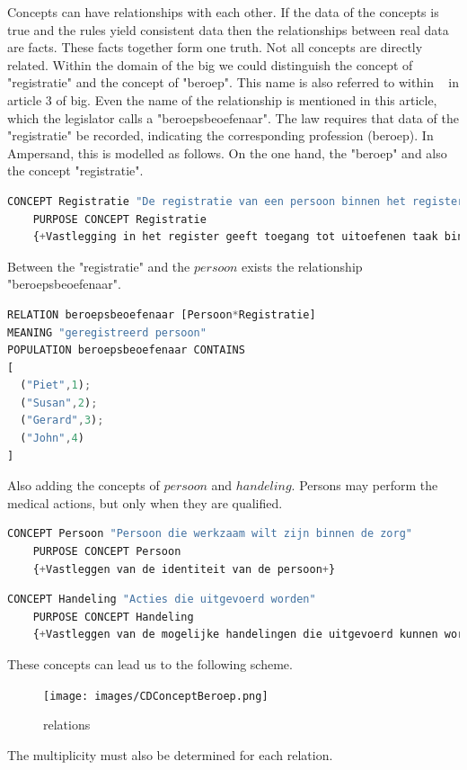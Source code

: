 Concepts can have relationships with each other.
If the data of the concepts is true and the rules yield consistent data then the relationships between real data are facts.
These facts together form one truth.
Not all concepts are directly related.
Within the domain of the \acrshort{big} we could distinguish the concept of "registratie" and the concept of "beroep".
This name is also referred to within ~ in article 3 of \acrshort{big}.
Even the name of the relationship is mentioned in this article, which the legislator calls a "beroepsbeoefenaar".
The law requires that data of the "registratie" be recorded, indicating the corresponding profession (beroep).
In Ampersand, this is modelled as follows.
On the one hand, the "beroep" and also the concept "registratie".
\begin{lstlisting}[language=Octave] 
    CONCEPT Registratie "De registratie van een persoon binnen het register" 
    PURPOSE CONCEPT Registratie 
    {+Vastlegging in het register geeft toegang tot uitoefenen taak binnen de gezondheidszorg+}
\end{lstlisting}
Between the "registratie" and the $persoon$ exists the relationship "beroepsbeoefenaar".
\begin{lstlisting}[language=Octave] 
RELATION beroepsbeoefenaar [Persoon*Registratie] 
MEANING "geregistreerd persoon"
POPULATION beroepsbeoefenaar CONTAINS 
[
  ("Piet",1);
  ("Susan",2);
  ("Gerard",3);
  ("John",4)
]\end{lstlisting}
Also adding the concepts of $persoon$ and $handeling$.
Persons may perform the medical actions, but only when they are qualified.
\begin{lstlisting}[language=Octave] 
    CONCEPT Persoon "Persoon die werkzaam wilt zijn binnen de zorg"
    PURPOSE CONCEPT Persoon 
    {+Vastleggen van de identiteit van de persoon+}
\end{lstlisting}
\begin{lstlisting}[language=Octave] 
    CONCEPT Handeling "Acties die uitgevoerd worden" 
    PURPOSE CONCEPT Handeling 
    {+Vastleggen van de mogelijke handelingen die uitgevoerd kunnen worden binnen de zorg+}
\end{lstlisting}
These concepts can lead us to the following scheme.
\begin{figure}[H] 
\texttt{[image: images/CDConceptBeroep.png]}
\centering
\caption{relations}
\label{fig:relations}
\end{figure}
The multiplicity must also be determined for each relation.
